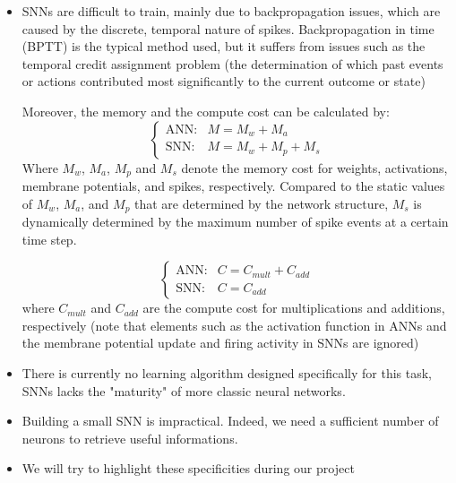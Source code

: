 \documentclass[11pt]{article}
\begin{document}
\begin{itemize}
  \item SNNs are difficult to train, mainly due to backpropagation issues, which are caused by the discrete, temporal nature of spikes. Backpropagation in time (BPTT) is the typical method used, but it suffers from issues such as the temporal credit assignment problem (the determination of which past events or actions contributed most significantly to the current outcome or state)

        Moreover, the memory and the compute cost can be calculated by:
        \begin{equation}
          \begin{cases}
            \text{ANN:} & M = M_w + M_a       \\
            \text{SNN:} & M = M_w + M_p + M_s
          \end{cases}
        \end{equation}
        Where $M_w$, $M_a$, $M_p$ and $M_s$ denote the memory cost for weights, activations, membrane potentials, and spikes, respectively. Compared to the static values of $M_w$, $M_a$, and $M_p$ that are determined by the network structure, $M_s$ is dynamically determined by the maximum number of spike events at a certain time step.\cite{rething_comparison_ann_snn}

        \begin{equation}
          \begin{cases}
            \text{ANN:} & C = C_{mult} + C_{add} \\
            \text{SNN:} & C = C_{add}
          \end{cases}
        \end{equation}
        where $C_{mult}$ and $C_{add}$ are the compute cost for multiplications and additions, respectively (note that elements such as the activation function in ANNs and the membrane potential update and firing activity in SNNs are ignored) \cite{rething_comparison_ann_snn}
  \item There is currently no learning algorithm designed specifically for this task, SNNs lacks the "maturity" of more classic neural networks.

  \item Building a small SNN is impractical. Indeed, we need a sufficient number of neurons to retrieve useful informations.

  \item We will try to highlight these specificities during our project
\end{itemize}
\end{document}
